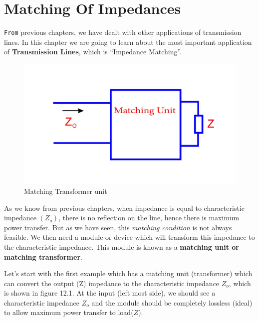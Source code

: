 \chapter{Matching Of Impedances}\label{lec:lec12}
\verb|From| previous chapters, we have dealt with other applications of transmission lines. In this chapter we are going to learn about the  most important application of \textbf{Transmission Lines}, which is \textquotedblleft Impedance Matching\textquotedblright.
\begin{figure}[h]
\centering
\includegraphics[width=1\linewidth]{./graphics/fig7}
\caption{Matching Transformer unit}
\end{figure} 

As we know from previous chapters, when impedance is equal to characteristic impedance $(Z_o)$, there is no reflection on the line, hence there is maximum power transfer. But as we have seen, this \textit{matching condition} is not always feasible. We then need a module or device which will transform this impedance to the characteristic impedance. This module  is known as a \textbf{matching unit or matching transformer}. 

Let's start with the first example which has a matching unit (transformer)  which can convert the output (Z) impedance to the characteristic impedance $Z_o$, which is shown in figure 12.1. At the input (left most side), we should see a characteristic impedance $ Z_o$ and the module should be completely lossless (ideal) to allow maximum power transfer to load($Z$).

